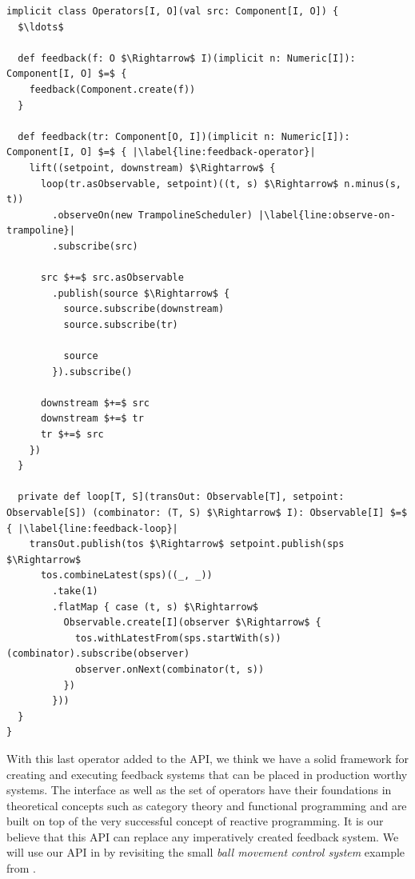 \begin{minipage}{\linewidth}
\begin{lstlisting}[style=ScalaStyle, caption={Feedback operator}, label={lst:feedback-operator}]
implicit class Operators[I, O](val src: Component[I, O]) {
  $\ldots$

  def feedback(f: O $\Rightarrow$ I)(implicit n: Numeric[I]): Component[I, O] $=$ {
    feedback(Component.create(f))
  }

  def feedback(tr: Component[O, I])(implicit n: Numeric[I]): Component[I, O] $=$ { |\label{line:feedback-operator}|
    lift((setpoint, downstream) $\Rightarrow$ {
      loop(tr.asObservable, setpoint)((t, s) $\Rightarrow$ n.minus(s, t))
        .observeOn(new TrampolineScheduler) |\label{line:observe-on-trampoline}|
        .subscribe(src)

      src $+=$ src.asObservable
        .publish(source $\Rightarrow$ {
          source.subscribe(downstream)
          source.subscribe(tr)

          source
        }).subscribe()

      downstream $+=$ src
      downstream $+=$ tr
      tr $+=$ src
    })
  }
  
  private def loop[T, S](transOut: Observable[T], setpoint: Observable[S]) (combinator: (T, S) $\Rightarrow$ I): Observable[I] $=$ { |\label{line:feedback-loop}|
    transOut.publish(tos $\Rightarrow$ setpoint.publish(sps $\Rightarrow$
      tos.combineLatest(sps)((_, _))
        .take(1)
        .flatMap { case (t, s) $\Rightarrow$
          Observable.create[I](observer $\Rightarrow$ {
            tos.withLatestFrom(sps.startWith(s))(combinator).subscribe(observer)
            observer.onNext(combinator(t, s))
          })
        }))
  }
}
\end{lstlisting}
\end{minipage}

With this last operator added to the API, we think we have a solid framework for creating and executing feedback systems that can be placed in production worthy systems. The interface as well as the set of operators have their foundations in theoretical concepts such as category theory and functional programming and are built on top of the very successful concept of reactive programming. It is our believe that this API can replace any imperatively created feedback system. We will use our API in  by revisiting the small \textit{ball movement control system} example from .